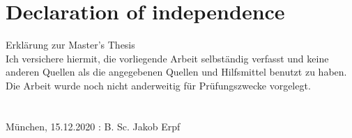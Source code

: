 \documentclass[a4paper,headsepline,footsepline,fontsize=11pt,BCOR=12mm,DIV=12]{report}
\newcommand{\nocontentsline}[3]{}
\newcommand{\tocless}[2]{\bgroup\let\addcontentsline=\nocontentsline#1{#2}\egroup}
\begin{document}

\pagebreak

\chapter*{Declaration of independence}

Erkl\"arung zur Master’s Thesis
\newline \\
Ich versichere hiermit, die vorliegende Arbeit selbst\"andig verfasst und keine anderen Quellen als die angegebenen Quellen und Hilfsmittel benutzt zu haben. Die Arbeit wurde noch nicht anderweitig f\"ur Pr\"ufungszwecke vorgelegt. 
\newline \\ \\ \\
M\"unchen, 15.12.2020 : \hrulefill \newline
\hspace*{0mm}\phantom{M\"unchen, 11.12.2020: } B. Sc. Jakob Erpf
\end{document}
